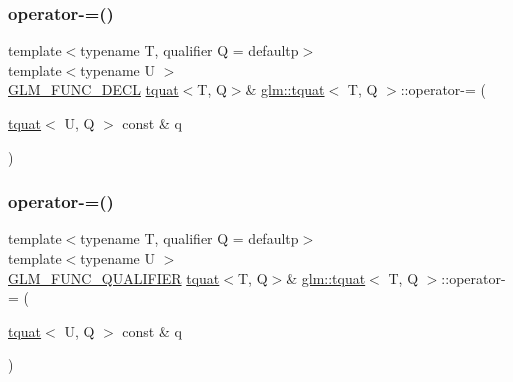 \subsubsection{\texorpdfstring{operator-\/=()}{operator-=()}\hspace{0.1cm}{\footnotesize\ttfamily [1/2]}}
{\footnotesize\ttfamily template$<$typename T, qualifier Q = defaultp$>$ \\
template$<$typename U $>$ \\
\hyperlink{setup_8hpp_ab2d052de21a70539923e9bcbf6e83a51}{G\+L\+M\+\_\+\+F\+U\+N\+C\+\_\+\+D\+E\+CL} \hyperlink{structglm_1_1tquat}{tquat}$<$T, Q$>$\& \hyperlink{structglm_1_1tquat}{glm\+::tquat}$<$ T, Q $>$\+::operator-\/= (\begin{DoxyParamCaption}\item[{\hyperlink{structglm_1_1tquat}{tquat}$<$ U, Q $>$ const \&}]{q }\end{DoxyParamCaption})}

\mbox{\label{structglm_1_1tquat_a4b913cb3c700dfbe26207223690ac255}} 
\subsubsection{\texorpdfstring{operator-\/=()}{operator-=()}\hspace{0.1cm}{\footnotesize\ttfamily [2/2]}}
{\footnotesize\ttfamily template$<$typename T, qualifier Q = defaultp$>$ \\
template$<$typename U $>$ \\
\hyperlink{setup_8hpp_a33fdea6f91c5f834105f7415e2a64407}{G\+L\+M\+\_\+\+F\+U\+N\+C\+\_\+\+Q\+U\+A\+L\+I\+F\+I\+ER} \hyperlink{structglm_1_1tquat}{tquat}$<$T, Q$>$\& \hyperlink{structglm_1_1tquat}{glm\+::tquat}$<$ T, Q $>$\+::operator-\/= (\begin{DoxyParamCaption}\item[{\hyperlink{structglm_1_1tquat}{tquat}$<$ U, Q $>$ const \&}]{q }\end{DoxyParamCaption})}

\mbox{\label{structglm_1_1tquat_aed8e8a44af5bcae23e60b4ddc170e762}} 
